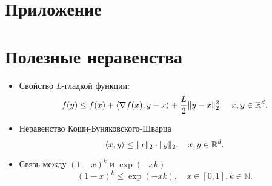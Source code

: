 \section*{Приложение}

\section{Полезные неравенства}\label{app:useful_facts}
    \begin{itemize}
        \item Свойство $L$-гладкой функции:
            \begin{equation}\label{eq:smooth_inequality}
                f(y) \leq f(x) + \langle \nabla f(x), y - x \rangle + \frac{L}{2} \|y - x\|_2^2, \quad x, y \in \mathbb{R}^d.
            \end{equation}
        \item Неравенство Коши-Буняковского-Шварца
            \begin{equation}\label{eq:CBS}
                \langle x, y \rangle \leq \|x\|_2 \cdot \|y\|_2, \quad x, y \in \mathbb{R}^d.
            \end{equation}
        \item Связь между $(1 - x)^k$ и $\exp(-xk)$
            \begin{equation}\label{eq:power_exp}
                (1 - x)^k \leq \exp(-xk), \quad x \in [0, 1], k \in \mathbb{N}.
            \end{equation}
    \end{itemize}

